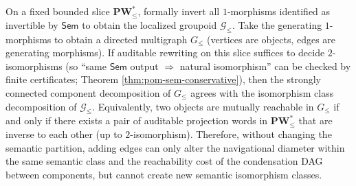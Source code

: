 \begin{conclusion}\label{con:xi-connectivity-scc-invertible-closure}
On a fixed bounded slice \(\mathbf{PW}^{\ast}_{\le}\), formally invert all \(1\)-morphisms identified as invertible by \(\mathsf{Sem}\) to obtain the localized groupoid \(\mathcal{G}_{\le}\).
Take the generating \(1\)-morphisms to obtain a directed multigraph \(G_{\le}\) (vertices are objects, edges are generating morphisms).
If auditable rewriting on this slice suffices to decide \(2\)-isomorphisms (so ``same \(\mathsf{Sem}\) output \(\Rightarrow\) natural isomorphism'' can be checked by finite certificates; Theorem \ref{thm:pom-sem-conservative}), then the strongly connected component decomposition of \(G_{\le}\) agrees with the isomorphism class decomposition of \(\mathcal{G}_{\le}\).
Equivalently, two objects are mutually reachable in \(G_{\le}\) if and only if there exists a pair of auditable projection words in \(\mathbf{PW}^{\ast}_{\le}\) that are inverse to each other (up to \(2\)-isomorphism).
Therefore, without changing the semantic partition, adding edges can only alter the navigational diameter within the same semantic class and the reachability cost of the condensation DAG between components, but cannot create new semantic isomorphism classes.
\end{conclusion}

